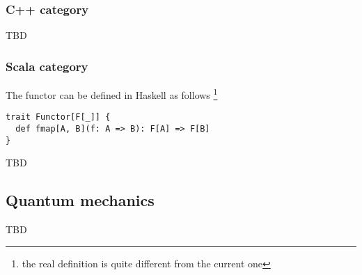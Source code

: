 \subsubsection{\textbf{C++} category}
TBD

\subsubsection{\textbf{Scala} category}
The functor can be defined in Haskell as follows
\footnote{the real definition is quite different from the current one}
\begin{example}
\label{ex:functor_scala}
\begin{verbatim}
trait Functor[F[_]] {
  def fmap[A, B](f: A => B): F[A] => F[B]
}\end{verbatim} 
\end{example}

TBD

\subsection{Quantum mechanics}

TBD
